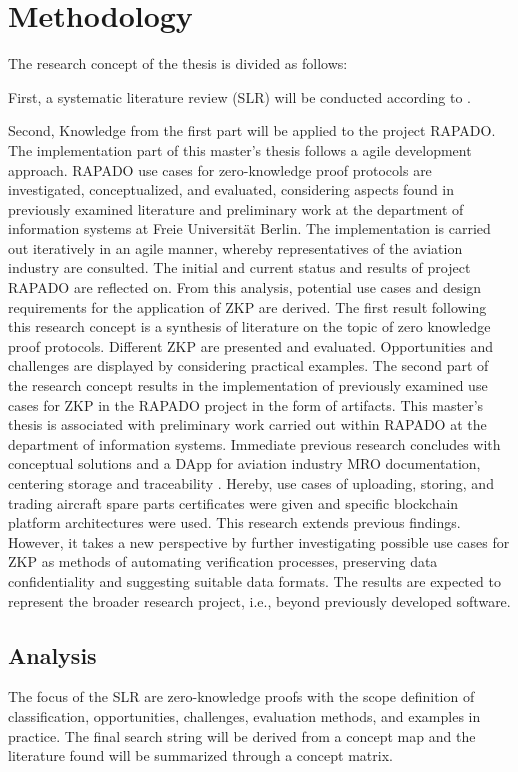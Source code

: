 \chapter{Methodology}
The research concept of the thesis is divided as follows: 

First, a systematic literature review (SLR) will be conducted according to \cite{HevnerAR2004DSiI, vomBrockeJan2019TDgs, Webster2002AnalyzingTP}. 

Second, Knowledge from the first part will be applied to the project RAPADO. The implementation part of this master's thesis follows a agile development approach. RAPADO use cases for zero-knowledge proof protocols are investigated, conceptualized, and evaluated, considering aspects found in previously examined literature and preliminary work at the department of information systems at Freie Universit{\"a}t Berlin. The implementation is carried out iteratively in an agile manner, whereby representatives of the aviation industry are consulted.
The initial and current status and results of project RAPADO are reflected on. From this analysis, potential use cases and design requirements for the application of ZKP are derived. The first result following this research concept is a synthesis of literature on the topic of zero knowledge proof protocols. Different ZKP are presented and evaluated. Opportunities and challenges are displayed by considering practical examples. The second part of the research concept results in the implementation of previously examined use cases for ZKP in the RAPADO project in the form of artifacts.
This master's thesis is associated with preliminary work carried out within RAPADO at the department of information systems. Immediate previous research concludes with conceptual solutions and a DApp for aviation industry MRO documentation, centering storage and traceability \citep{ZedelJ, semesterproject}. Hereby, use cases of uploading, storing, and trading aircraft spare parts certificates were given and specific blockchain platform architectures were used. This research extends previous findings. However, it takes a new perspective by further investigating possible use cases for ZKP as methods of automating verification processes, preserving data confidentiality and suggesting suitable data formats. The results are expected to represent the broader research project, i.e., beyond previously developed software.
\section{Analysis}
The focus of the SLR are zero-knowledge proofs with the scope definition of classification, opportunities, challenges, evaluation methods, and examples in practice. The final search string will be derived from a concept map and the literature found will be summarized through a concept matrix.
